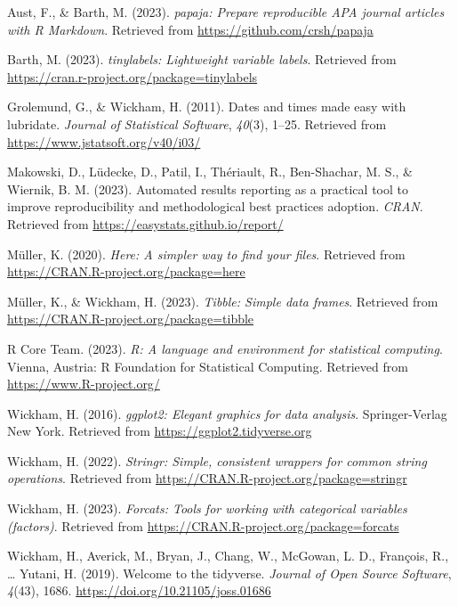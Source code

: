 \documentclass[
  english,
  man,floatsintext]{apa6}
\newlength{\cslhangindent}
\newenvironment{CSLReferences}[2] %
 {\begin{list}{}{%
  \setlength{\itemindent}{0pt}
  \setlength{\leftmargin}{0pt}
  \setlength{\parsep}{0pt}
  \ifodd #1
   \setlength{\leftmargin}{\cslhangindent}
   \setlength{\itemindent}{-1\cslhangindent}
  \fi
  \setlength{\itemsep}{#2\baselineskip}}}
 {\end{list}}
\begin{document}
\label{refs}
\begin{CSLReferences}{1}{0}
Aust, F., \& Barth, M. (2023). \emph{{papaja}: {Prepare} reproducible {APA} journal articles with {R Markdown}}. Retrieved from \url{https://github.com/crsh/papaja}

Barth, M. (2023). \emph{{tinylabels}: Lightweight variable labels}. Retrieved from \url{https://cran.r-project.org/package=tinylabels}

Grolemund, G., \& Wickham, H. (2011). Dates and times made easy with {lubridate}. \emph{Journal of Statistical Software}, \emph{40}(3), 1--25. Retrieved from \url{https://www.jstatsoft.org/v40/i03/}

Makowski, D., Lüdecke, D., Patil, I., Thériault, R., Ben-Shachar, M. S., \& Wiernik, B. M. (2023). Automated results reporting as a practical tool to improve reproducibility and methodological best practices adoption. \emph{CRAN}. Retrieved from \url{https://easystats.github.io/report/}

Müller, K. (2020). \emph{Here: A simpler way to find your files}. Retrieved from \url{https://CRAN.R-project.org/package=here}

Müller, K., \& Wickham, H. (2023). \emph{Tibble: Simple data frames}. Retrieved from \url{https://CRAN.R-project.org/package=tibble}

R Core Team. (2023). \emph{R: A language and environment for statistical computing}. Vienna, Austria: R Foundation for Statistical Computing. Retrieved from \url{https://www.R-project.org/}

Wickham, H. (2016). \emph{ggplot2: Elegant graphics for data analysis}. Springer-Verlag New York. Retrieved from \url{https://ggplot2.tidyverse.org}

Wickham, H. (2022). \emph{Stringr: Simple, consistent wrappers for common string operations}. Retrieved from \url{https://CRAN.R-project.org/package=stringr}

Wickham, H. (2023). \emph{Forcats: Tools for working with categorical variables (factors)}. Retrieved from \url{https://CRAN.R-project.org/package=forcats}

Wickham, H., Averick, M., Bryan, J., Chang, W., McGowan, L. D., François, R., \ldots{} Yutani, H. (2019). Welcome to the {tidyverse}. \emph{Journal of Open Source Software}, \emph{4}(43), 1686. \url{https://doi.org/10.21105/joss.01686}


\end{CSLReferences}
\end{document}
